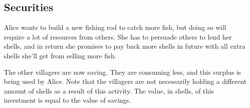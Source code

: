 
\subsection{Securities}

Alice wants to build a new fishing rod to catch more fish, but doing so will require a lot of resources from others. She has to persuade others to lend her shells, and in return she promises to pay back more shells in future with all extra shells she’ll get from selling more fish.

The other villagers are now saving. They are consuming less, and this surplus is being used by Alice. Note that the villagers are not necessarily holding a different amount of shells as a result of this activity. The value, in shells, of this investment is equal to the value of savings.

